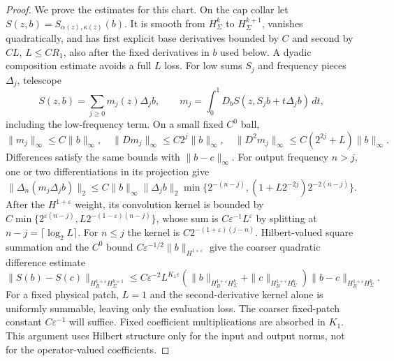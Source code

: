 \documentclass[11pt]{amsart}
\theoremstyle{definition}
\theoremstyle{remark}
\theoremstyle{plain}
\begin{document}
\begin{proof}
We prove the estimates for this chart. On the cap collar let
$S(z,b)=S_{\alpha(z),\kappa(z)}(b)$. It is smooth from
$H^k_\Sigma$ to $H^{k+1}_\Sigma$, vanishes quadratically,
and has first explicit base derivatives bounded by $C$ and second
by $CL$, $L\leq CR_1$, also after the fixed derivatives in $b$
used below. A dyadic composition estimate avoids a full $L$ loss.
For low sums $S_j$ and frequency pieces $\Delta_j$, telescope
\[
 S(z,b)=\sum_{j\geq0}m_j(z)\Delta_jb,\qquad
 m_j=\int_0^1D_bS(z,S_jb+t\Delta_jb)\,dt,
\]
including the low-frequency term. On a small fixed $C^0$ ball,
\[
 \|m_j\|_\infty\leq C\|b\|_\infty,\quad
 \|Dm_j\|_\infty\leq C2^j\|b\|_\infty,\quad
 \|D^2m_j\|_\infty\leq C(2^{2j}+L)\|b\|_\infty.
\]
Differences satisfy the same bounds with $\|b-c\|_\infty$.
For output frequency $n>j$, one or two differentiations in its
projection give
\[
 \|\Delta_n(m_j\Delta_jb)\|_2
 \leq C\|b\|_\infty\|\Delta_jb\|_2
       \min\{2^{-(n-j)},(1+L2^{-2j})2^{-2(n-j)}\}.
\]
After the $H^{1+\varepsilon}$ weight, its convolution kernel
is bounded by
$C\min\{2^{\varepsilon(n-j)},L2^{-(1-\varepsilon)(n-j)}\}$,
whose sum is $C\varepsilon^{-1}L^\varepsilon$ by splitting
at $n-j=\lceil\log_2L\rceil$. For $n\leq j$ the kernel
is $C2^{-(1+\varepsilon)(j-n)}$. Hilbert-valued square summation
and the $C^0$ bound $C\varepsilon^{-1/2}\|b\|_{H^{1+\varepsilon}}$
give the coarser quadratic difference estimate
\begin{equation}\label{eq:gluing-surface-composition}
 \|S(b)-S(c)\|_{H_B^{1+\varepsilon}H^{k+1}_\Sigma}
 \leq C\varepsilon^{-2}L^{K_1\varepsilon}
      (\|b\|_{H_B^{1+\varepsilon}H^k_\Sigma}
       +\|c\|_{H_B^{1+\varepsilon}H^k_\Sigma})
                                   \|b-c\|_{H_B^{1+\varepsilon}H^k_\Sigma}.
\end{equation}
For a fixed physical patch, $L=1$ and the second-derivative
kernel alone is uniformly summable, leaving only the evaluation
loss. The coarser fixed-patch constant $C\varepsilon^{-1}$
will suffice. Fixed coefficient multiplications are absorbed in
$K_1$. This argument uses Hilbert structure only for the input
and output norms, not for the operator-valued coefficients.


\end{proof}
\end{document}
